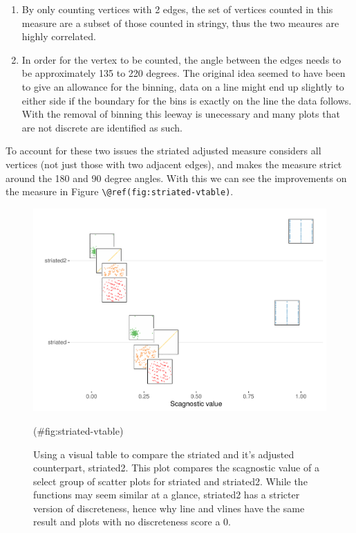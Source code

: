 \begin{enumerate}
\def\labelenumi{\arabic{enumi}.}
\item
  By only counting vertices with 2 edges, the set of vertices counted in
  this measure are a subset of those counted in stringy, thus the two
  meaures are highly correlated.
\item
  In order for the vertex to be counted, the angle between the edges
  needs to be approximately 135 to 220 degrees. The original idea seemed
  to have been to give an allowance for the binning, data on a line
  might end up slightly to either side if the boundary for the bins is
  exactly on the line the data follows. With the removal of binning this
  leeway is unecessary and many plots that are not discrete are
  identified as such.
\end{enumerate}

To account for these two issues the striated adjusted measure considers
all vertices (not just those with two adjacent edges), and makes the
measure strict around the 180 and 90 degree angles. With this we can see
the improvements on the measure in Figure
\texttt{\textbackslash{}@ref(fig:striated-vtable)}.

\begin{Schunk}
\begin{figure}
\includegraphics[width=1\linewidth]{mason-lee-laa-cook_files/figure-latex/striated-vtable-1} \caption[Using a visual table to compare the striated and it's adjusted counterpart, striated2]{Using a visual table to compare the striated and it's adjusted counterpart, striated2. This plot compares the scagnostic value of a select group of scatter plots for striated and striated2. While the functions may seem similar at a glance, striated2 has a stricter version of discreteness, hence why line and vlines have the same result and plots with no discreteness score a 0.}(\#fig:striated-vtable)
\end{figure}
\end{Schunk}

